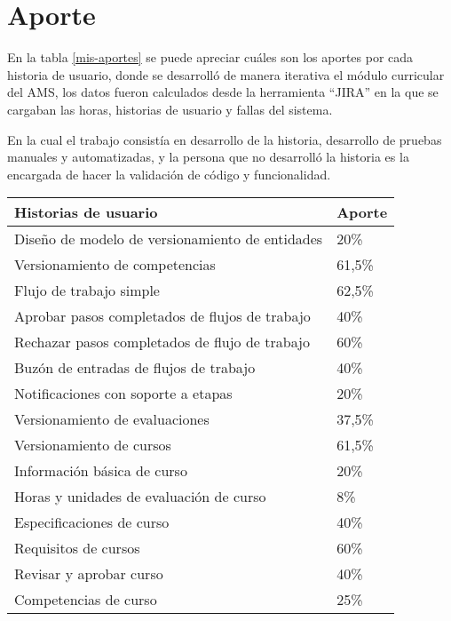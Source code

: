 \section{Aporte}
En la tabla \ref{mis-aportes} se puede apreciar cuáles son los aportes por cada historia de usuario, donde se desarrolló de manera iterativa el módulo curricular del AMS, los datos fueron calculados desde la herramienta \enquote{JIRA} en la que se cargaban las horas, historias de usuario y fallas del sistema.

En la cual el trabajo consistía en desarrollo de la historia, desarrollo de pruebas manuales y automatizadas, y la persona que no desarrolló la historia es la encargada de hacer la validación de código y funcionalidad.

\begin{table}[H]
\centering
\begin{tabular}{@{}ll@{}}
\toprule
Historias de usuario                                & Aporte \\ \midrule
Diseño de modelo de versionamiento de entidades     &  20\%  \\
Versionamiento de competencias                      & 61,5\% \\
Flujo de trabajo simple                             & 62,5\% \\
Aprobar pasos completados de flujos de trabajo      &  40\%  \\
Rechazar pasos completados de flujo de trabajo      &  60\%  \\
Buzón de entradas de flujos de trabajo              &  40\%  \\
Notificaciones con soporte a etapas                 &  20\%  \\
Versionamiento de evaluaciones                      & 37,5\% \\
Versionamiento de cursos                            & 61,5\% \\
Información básica de curso                         &  20\%  \\
Horas y unidades de evaluación de curso             &   8\%  \\
Especificaciones de curso                           &  40\%  \\
Requisitos de cursos                                &  60\%  \\
Revisar y aprobar curso                             &  40\%  \\
Competencias de curso                               &  25\%  \\

\end{tabular}
\end{table}
